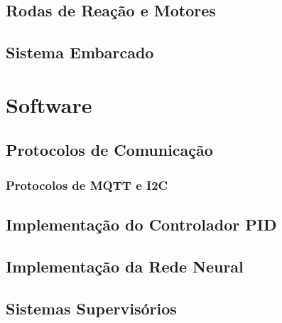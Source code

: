 \subsection{Rodas de Reação e Motores}

\subsection{Sistema Embarcado}

\section{Software}

\subsection{Protocolos de Comunicação}
\subsubsection{Protocolos de MQTT e I2C}

\subsection{Implementação do Controlador PID}

\subsection{Implementação da Rede Neural}

\subsection{Sistemas Supervisórios}
